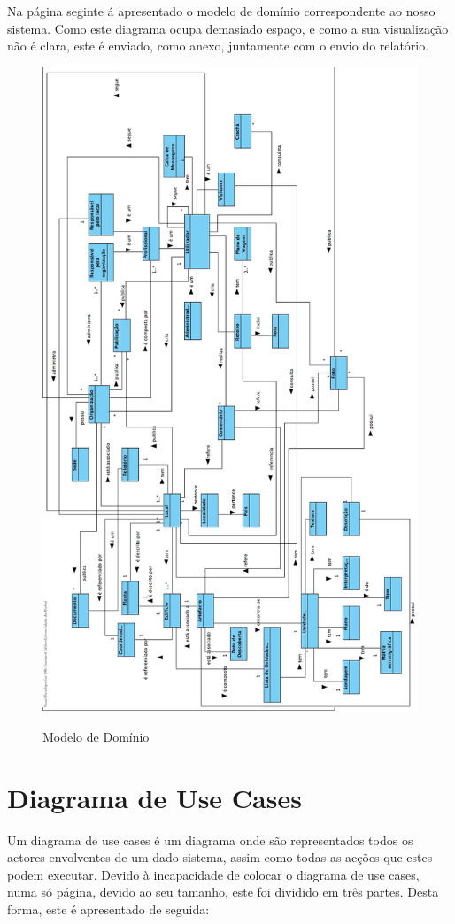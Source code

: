 \documentclass[12pt,a4paper]{article}
\begin{document}
Na página seginte á apresentado o modelo de domínio correspondente ao nosso sistema. Como este diagrama ocupa demasiado espaço, e como  a sua visualização não é clara, este é enviado, como anexo, juntamente com o envio do relatório.
\newpage

\begin{figure}[h!]
\centering
\includegraphics[scale=0.4]{dominio}
\label{modelo domínio}
\caption{Modelo de Domínio}
\end{figure}


\clearpage
\section{Diagrama de Use Cases}
Um diagrama de use cases é um diagrama onde são representados todos os actores envolventes de um dado sistema, assim como todas as acções que estes podem executar. Devido à incapacidade de colocar o diagrama de use cases, numa só página, devido ao seu tamanho, este foi dividido em três partes. Desta forma, este é apresentado de seguida:\\
\end{document}
